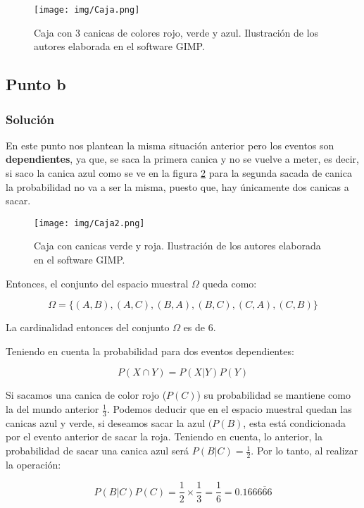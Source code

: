 \documentclass[12pt]{article}
\begin{document}
\begin{figure}[ht]
  \centering
  \texttt{[image: img/Caja.png]}
  \caption{\label{fig:caja-canica} Caja con 3 canicas de colores rojo, verde y azul. Ilustración de los autores elaborada en el software GIMP.}
\end{figure}


\subsection{Punto b}
\subsubsection{Solución}

En este punto nos plantean la misma situación anterior pero los eventos son \textbf{dependientes}, ya que, se saca la primera canica y no se vuelve a meter, es decir, si saco la canica azul como se ve en la figura \ref{fig:caja-2} para la segunda sacada de canica la probabilidad no va a ser la misma, puesto que, hay únicamente dos canicas a sacar. 

\begin{figure}[ht]
  \centering
  \texttt{[image: img/Caja2.png]}
  \caption{\label{fig:caja-2} Caja con canicas verde y roja. Ilustración de los autores elaborada en el software GIMP.}
\end{figure}


Entonces, el conjunto del espacio muestral \(\Omega\) queda como:

\[
  \Omega = \{ (A, B), (A, C), (B, A), (B, C), (C, A), (C, B)\}
\]

La cardinalidad entonces del conjunto \(\Omega\) es de 6.

Teniendo en cuenta la probabilidad para dos eventos dependientes:

\[
  P(X \cap Y) = P(X|Y) P(Y)
\]

Si sacamos una canica de color rojo (\(P(C)\)) su probabilidad se mantiene como la del mundo anterior \(\frac{1}{3}\). Podemos deducir que en el espacio muestral quedan las canicas azul y verde, si deseamos sacar la azul \((P(B)\), esta está condicionada por el evento anterior de sacar la roja. Teniendo en cuenta, lo anterior, la probabilidad de sacar una canica azul será \(P(B|C) = \frac{1}{2}\). Por lo tanto, al realizar la operación:

\[
  P(B|C)P(C) = \frac{1}{2} \times \frac{1}{3} = \frac{1}{6} = 0.166\overline{666}
\]
\end{document}
